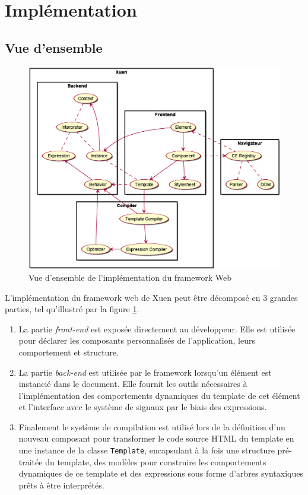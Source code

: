 \section{Implémentation}

\subsection{Vue d'ensemble}
\begin{figure}[h]
	\centering
	\includegraphics[width=\textwidth]{img/web_overview.eps}
	\caption{Vue d'ensemble de l'implémentation du framework Web}
	\label{fig:web-overview}
\end{figure}

L'implémentation du framework web de Xuen peut être décomposé en 3 grandes parties, tel qu'illustré par la figure \ref{fig:web-overview}.

\begin{enumerate}
	\item La partie \emph{front-end} est exposée directement au développeur. Elle est utilisée pour déclarer les composants personnalisés de l'application, leurs comportement et structure.
	\item La partie \emph{back-end} est utilisée par le framework lorsqu'un élément est instancié dans le document. Elle fournit les outils nécessaires à l'implémentation des comportements dynamiques du template de cet élément et l'interface avec le système de signaux par le biais des expressions.
	\item Finalement le système de compilation est utilisé lors de la définition d'un nouveau composant pour transformer le code source HTML du template en une instance de la classe \texttt{Template}, encapsulant à la fois une structure pré-traitée du template, des modèles pour construire les comportements dynamiques de ce template et des expressions sous forme d'arbres syntaxiques prêts à être interprétés.  
\end{enumerate}

